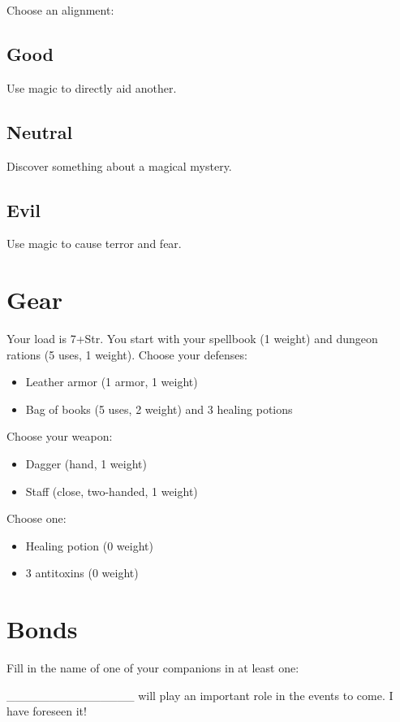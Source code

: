  Choose an alignment:
\subsection{Good}


 Use magic to directly aid another.
\subsection{Neutral}


 Discover something about a magical mystery.
\subsection{Evil}


 Use magic to cause terror and fear.
\section{Gear}


 Your load is 7+Str. You start with your spellbook (1 weight) and dungeon rations (5 uses, 1 weight). Choose your defenses:
\begin{itemize}
\item Leather armor (1 armor, 1 weight)
\item Bag of books (5 uses, 2 weight) and 3 healing potions

\end{itemize}


 Choose your weapon:
\begin{itemize}
\item Dagger (hand, 1 weight)
\item Staff (close, two-handed, 1 weight)

\end{itemize}


 Choose one:
\begin{itemize}
\item Healing potion (0 weight)
\item 3 antitoxins (0 weight)

\end{itemize}
\section{Bonds}


 Fill in the name of one of your companions in at least one:


 \_\_\_\_\_\_\_\_\_\_\_\_\_\_\_ will play an important role in the events to come. I have foreseen it!


